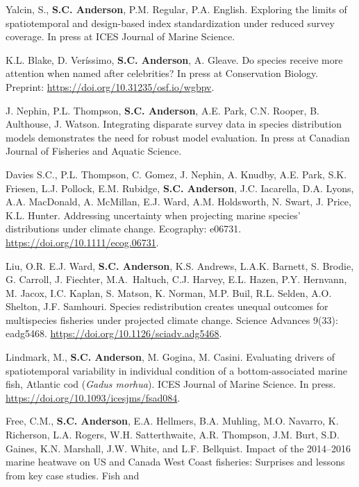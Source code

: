 \begin{description}
\tightlist
\item[2023]
Yalcin, S., \textbf{S.C. Anderson}, P.M. Regular, P.A. English.
Exploring the limits of spatiotemporal and design-based index
standardization under reduced survey coverage. In press at ICES Journal
of Marine Science.
\item[2023]
K.L. Blake, D. Veríssimo, \textbf{S.C. Anderson}, A. Gleave. Do species
receive more attention when named after celebrities? In press at
Conservation Biology. Preprint:
\url{https://doi.org/10.31235/osf.io/wgbpv}.
\item[2023]
J. Nephin, P.L. Thompson, \textbf{S.C. Anderson}, A.E. Park, C.N.
Rooper, B. Aulthouse, J. Watson. Integrating disparate survey data in
species distribution models demonstrates the need for robust model
evaluation. In press at Canadian Journal of Fisheries and Aquatic
Science.
\item[2023]
Davies S.C., P.L. Thompson, C. Gomez, J. Nephin, A. Knudby, A.E. Park,
S.K. Friesen, L.J. Pollock, E.M. Rubidge, \textbf{S.C. Anderson}, J.C.
Iacarella, D.A. Lyons, A.A. MacDonald, A. McMillan, E.J. Ward, A.M.
Holdsworth, N. Swart, J. Price, K.L. Hunter. Addressing uncertainty when
projecting marine species' distributions under climate change.
Ecography: e06731. \url{https://doi.org/10.1111/ecog.06731}.
\item[2023]
Liu, O.R. E.J. Ward, \textbf{S.C. Anderson}, K.S. Andrews, L.A.K.
Barnett, S. Brodie, G. Carroll, J. Fiechter, M.A.\ Haltuch, C.J. Harvey,
E.L. Hazen, P.Y. Hernvann, M. Jacox, I.C. Kaplan, S. Matson, K. Norman,
M.P. Buil, R.L. Selden, A.O. Shelton, J.F. Samhouri. Species
redistribution creates unequal outcomes for multispecies fisheries under
projected climate change. Science Advances 9(33): eadg5468.
\url{https://doi.org/10.1126/sciadv.adg5468}.
\item[2023]
Lindmark, M., \textbf{S.C. Anderson}, M. Gogina, M. Casini. Evaluating
drivers of spatiotemporal variability in individual condition of a
bottom-associated marine fish, Atlantic cod (\emph{Gadus morhua}). ICES
Journal of Marine Science. In press.
\url{https://doi.org/10.1093/icesjms/fsad084}.
\item[2023]
Free, C.M., \textbf{S.C. Anderson}, E.A. Hellmers, B.A. Muhling, M.O.
Navarro, K. Richerson, L.A. Rogers, W.H. Satterthwaite, A.R. Thompson,
J.M. Burt, S.D. Gaines, K.N. Marshall, J.W. White, and L.F. Bellquist.
Impact of the 2014--2016 marine heatwave on US and Canada West Coast
fisheries: Surprises and lessons from key case studies. Fish and

\end{description}
